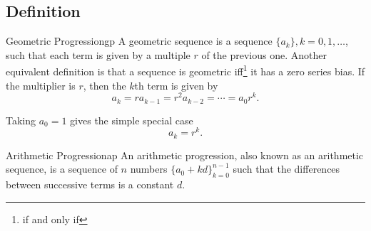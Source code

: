 \subsection{Definition}
\begin{theobox}{Geometric Progression\cite{Weisstein2019gp}}{gp}
    A geometric sequence is a sequence $\{a_k\}, k=0, 1, \ldots$, such that each term is given by a multiple $r$ of the previous one. Another equivalent definition is that a sequence is geometric iff\footnote{if and only if} it has a zero series bias. If the multiplier is $r$, then the $k$th term is given by
    \[
        a_k = ra_{k-1} = r^2a_{k-2} = \cdots = a_0r^k.
    \]

    Taking $a_0=1$ gives the simple special case
    \[
        a_k = r^k.
    \]
\end{theobox}

\begin{theobox}{Arithmetic Progression\cite{Weisstein2019ap}}{ap}
    An arithmetic progression, also known as an arithmetic sequence, is a sequence of $n$ numbers $\{a_0+kd\}^{n-1}_{k=0}$ such that the differences between successive terms is a constant $d$.
\end{theobox}
